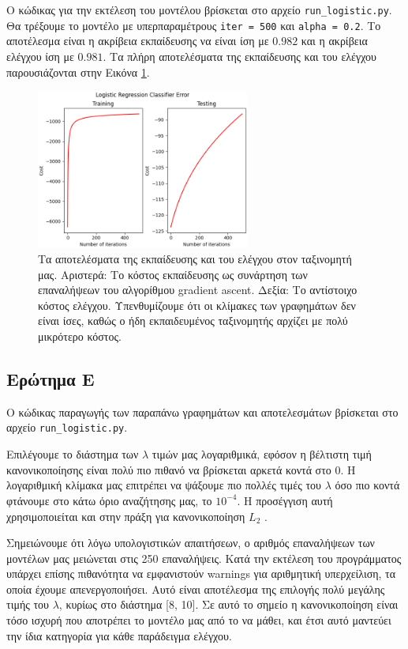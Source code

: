 \documentclass{article}
\newcommand{\code}{\texttt}
\begin{document}
Ο κώδικας για την εκτέλεση του μοντέλου βρίσκεται στο αρχείο \code{run\_logistic.py}. Θα τρέξουμε το μοντέλο με υπερπαραμέτρους \code{iter = 500} και \code{alpha = 0.2}. Το αποτέλεσμα είναι η ακρίβεια εκπαίδευσης να είναι ίση με $0.982$ και η ακρίβεια ελέγχου ίση με $0.981$. Τα πλήρη αποτελέσματα της εκπαίδευσης και του ελέγχου παρουσιάζονται στην Εικόνα \ref{logistic_train_test}.

\begin{figure}
	\includegraphics[width=7cm]{logistic_error.png}
	\centering
	\caption{Τα αποτελέσματα της εκπαίδευσης και του ελέγχου στον ταξινομητή μας. Αριστερά: Το κόστος εκπαίδευσης ως συνάρτηση των επαναλήψεων του αλγορίθμου gradient ascent. Δεξία: Το αντίστοιχο κόστος ελέγχου. Υπενθυμίζουμε ότι οι κλίμακες των γραφημάτων δεν είναι ίσες, καθώς ο ήδη εκπαιδευμένος ταξινομητής αρχίζει με πολύ μικρότερο κόστος. }
	\label{logistic_train_test}
\end{figure}


\subsection{Ερώτημα Ε}
Ο κώδικας παραγωγής των παραπάνω γραφημάτων και αποτελεσμάτων βρίσκεται στο αρχείο \code{run\_logistic.py}.

Επιλέγουμε το διάστημα των \code{$\lambda$} τιμών μας λογαριθμικά, εφόσον η βέλτιστη τιμή κανονικοποίησης είναι πολύ πιο πιθανό να βρίσκεται αρκετά κοντά στο 0. Η λογαριθμική κλίμακα μας επιτρέπει να ψάξουμε πιο πολλές τιμές του \code{$\lambda$} όσο πιο κοντά φτάνουμε στο κάτω όριο αναζήτησης μας, το $10^{-4}$. Η προσέγγιση αυτή χρησιμοποιείται και στην πράξη για κανονικοποίηση $L_{2}$ \cite{jerome}.

Σημειώνουμε ότι λόγω υπολογιστικών απαιτήσεων, ο αριθμός επαναλήψεων των μοντέλων μας μειώνεται στις 250 επαναλήψεις. Κατά την εκτέλεση του προγράμματος υπάρχει επίσης πιθανότητα να εμφανιστούν warnings για αριθμητική υπερχείλιση, τα οποία έχουμε απενεργοποιήσει. Αυτό είναι αποτέλεσμα της επιλογής πολύ μεγάλης τιμής του \code{$\lambda$}, κυρίως στο διάστημα [8, 10]. Σε αυτό το σημείο η κανονικοποίηση είναι τόσο ισχυρή που αποτρέπει το μοντέλο μας από το να μάθει, και έτσι αυτό μαντεύει την ίδια κατηγορία για κάθε παράδειγμα ελέγχου.
\end{document}
